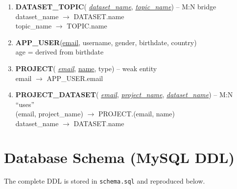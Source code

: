 \documentclass[12pt,a4paper]{article}
\begin{document}
\begin{enumerate}
  \item \textbf{DATASET\_TOPIC}(%
        \underline{\textit{dataset\_name}},
        \underline{\textit{topic\_name}}) -- M:N bridge\\
        dataset\_name $\rightarrow$ DATASET.name\\
        topic\_name $\rightarrow$ TOPIC.name

  \item \textbf{APP\_USER}(\underline{email}, username, gender,
        birthdate, country)\\
        age = derived from birthdate

  \item \textbf{PROJECT}(%
        \underline{\textit{email}},
        \underline{name},
        type) -- weak entity\\
        email $\rightarrow$ APP\_USER.email

  \item \textbf{PROJECT\_DATASET}(%
        \underline{\textit{email}},
        \underline{\textit{project\_name}},
        \underline{\textit{dataset\_name}}) -- M:N ``uses''\\
        (email, project\_name) $\rightarrow$ PROJECT.(email, name)\\
        dataset\_name $\rightarrow$ DATASET.name
\end{enumerate}

\newpage
\section{Database Schema (MySQL DDL)}

The complete DDL is stored in \texttt{schema.sql} and reproduced below.


\end{document}

